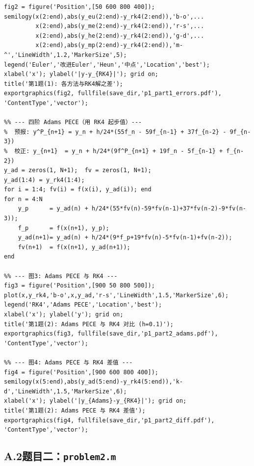 \documentclass[UTF8,a4paper,11pt]{article}
\begin{document}
\begin{lstlisting}[style=matlab, caption={\texttt{problem1.m}：五种单步方法与四阶 Adams PECE}]
%% --- 图2: 各方法与 RK4 的差 ---
fig2 = figure('Position',[50 600 800 400]);
semilogy(x(2:end),abs(y_eu(2:end)-y_rk4(2:end)),'b-o',...
         x(2:end),abs(y_me(2:end)-y_rk4(2:end)),'r-s',...
         x(2:end),abs(y_he(2:end)-y_rk4(2:end)),'g-d',...
         x(2:end),abs(y_mp(2:end)-y_rk4(2:end)),'m-^','LineWidth',1.2,'MarkerSize',5);
legend('Euler','改进Euler','Heun','中点','Location','best');
xlabel('x'); ylabel('|y-y_{RK4}|'); grid on;
title('第1题(1): 各方法与RK4解之差');
exportgraphics(fig2, fullfile(save_dir,'p1_part1_errors.pdf'), 'ContentType','vector');

%% --- 四阶 Adams PECE（用 RK4 起步值）---
%  预报: y^P_{n+1} = y_n + h/24*(55f_n - 59f_{n-1} + 37f_{n-2} - 9f_{n-3})
%  校正: y_{n+1}  = y_n + h/24*(9f^P_{n+1} + 19f_n - 5f_{n-1} + f_{n-2})
y_ad = zeros(1, N+1);  fv = zeros(1, N+1);
y_ad(1:4) = y_rk4(1:4);
for i = 1:4; fv(i) = f(x(i), y_ad(i)); end
for n = 4:N
    y_p      = y_ad(n) + h/24*(55*fv(n)-59*fv(n-1)+37*fv(n-2)-9*fv(n-3));
    f_p      = f(x(n+1), y_p);
    y_ad(n+1)= y_ad(n) + h/24*(9*f_p+19*fv(n)-5*fv(n-1)+fv(n-2));
    fv(n+1)  = f(x(n+1), y_ad(n+1));
end

%% --- 图3: Adams PECE 与 RK4 ---
fig3 = figure('Position',[900 50 800 500]);
plot(x,y_rk4,'b-o',x,y_ad,'r-s','LineWidth',1.5,'MarkerSize',6);
legend('RK4','Adams PECE','Location','best');
xlabel('x'); ylabel('y'); grid on;
title('第1题(2): Adams PECE 与 RK4 对比 (h=0.1)');
exportgraphics(fig3, fullfile(save_dir,'p1_part2_adams.pdf'), 'ContentType','vector');

%% --- 图4: Adams PECE 与 RK4 差值 ---
fig4 = figure('Position',[900 600 800 400]);
semilogy(x(5:end),abs(y_ad(5:end)-y_rk4(5:end)),'k-d','LineWidth',1.5,'MarkerSize',6);
xlabel('x'); ylabel('|y_{Adams}-y_{RK4}|'); grid on;
title('第1题(2): Adams PECE 与 RK4 差值');
exportgraphics(fig4, fullfile(save_dir,'p1_part2_diff.pdf'), 'ContentType','vector');
\end{lstlisting}

\subsection*{A.2\quad 题目二：\texttt{problem2.m}}
\end{document}
